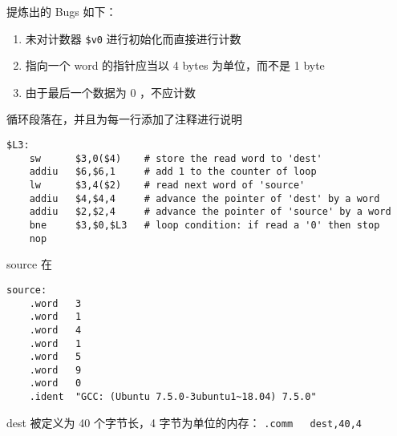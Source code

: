 \documentclass[lang=cn,11pt,a4paper,cite=authoryear]{elegantpaper}
\begin{document}

提炼出的 Bugs 如下：

\begin{enumerate}
    \item 未对计数器 \lstinline{$v0} 进行初始化而直接进行计数
    \item 指向一个 word 的指针应当以 4 bytes 为单位，而不是 1 byte
    \item 由于最后一个数据为 0 ，不应计数
\end{enumerate}


循环段落在，并且为每一行添加了注释进行说明

\begin{lstlisting}
$L3:
    sw      $3,0($4)    # store the read word to 'dest'
    addiu   $6,$6,1     # add 1 to the counter of loop
    lw      $3,4($2)    # read next word of 'source'
    addiu   $4,$4,4     # advance the pointer of 'dest' by a word 
    addiu   $2,$2,4     # advance the pointer of 'source' by a word 
    bne     $3,$0,$L3   # loop condition: if read a '0' then stop
    nop
\end{lstlisting}    


source 在 

\begin{lstlisting}
source:
    .word   3
    .word   1
    .word   4
    .word   1
    .word   5
    .word   9
    .word   0
    .ident  "GCC: (Ubuntu 7.5.0-3ubuntu1~18.04) 7.5.0"

\end{lstlisting}

dest 被定义为 40 个字节长，4 字节为单位的内存： \lstinline{.comm   dest,40,4}



\end{document}
